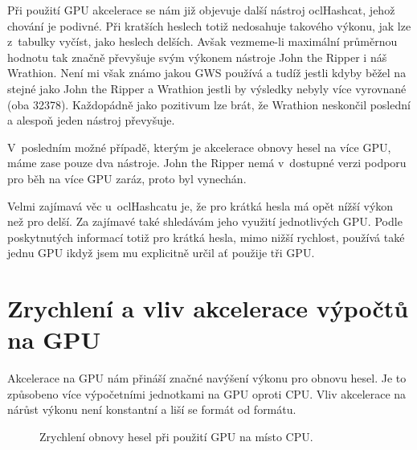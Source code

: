 Při použití GPU akcelerace se nám již objevuje další nástroj oclHashcat, jehož chování je
podivné. Při kratších heslech totiž nedosahuje takového výkonu, jak lze z~tabulky vyčíst, jako
heslech delších. Avšak vezmeme-li maximální průměrnou hodnotu tak značně převyšuje svým výkonem
nástroje John the Ripper i náš Wrathion. Není mi však známo jakou GWS používá a tudíž jestli
kdyby běžel na stejné jako John the Ripper a Wrathion jestli by výsledky nebyly více vyrovnané
(oba 32378). Každopádně jako pozitivum lze brát, že Wrathion neskončil poslední a alespoň jeden
nástroj převyšuje.

V~posledním možné případě, kterým je akcelerace obnovy hesel na více GPU, máme zase pouze dva
nástroje. John the Ripper nemá v~dostupné verzi podporu pro běh na více GPU zaráz, proto byl
vynechán. 

Velmi zajímavá věc u~oclHashcatu je, že pro krátká hesla má opět nížší výkon než pro delší. Za
zajímavé také shledávám jeho využití jednotlivých GPU. Podle poskytnutých informací totiž pro
krátká hesla, mimo nižší rychlost, používá také jednu GPU ikdyž jsem mu explicitně určil ať
použije tři GPU.
\section{Zrychlení a vliv akcelerace výpočtů na GPU}
\label{sec:zrychlenit}
Akcelerace na GPU nám přináší značné navýšení výkonu pro obnovu hesel. Je to způsobeno více
výpočetními jednotkami na GPU oproti CPU. Vliv akcelerace na nárůst výkonu není konstantní a liší
se formát od formátu.
\begin{figure}[ht]
    \begin{center}
	\caption{Zrychlení obnovy hesel při použití GPU na místo CPU.}
	\label{memory}
    \end{center}
\end{figure}

